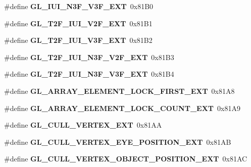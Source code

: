 \begin{DoxyCompactItemize}
\item 
\#define {\bfseries G\+L\+\_\+\+I\+U\+I\+\_\+\+N3\+F\+\_\+\+V3\+F\+\_\+\+E\+X\+T}~0x81\+B0\label{_s_d_l__opengl_8h_a821236f54a3d536e39d0c0c1b2c2200b}

\item 
\#define {\bfseries G\+L\+\_\+\+T2\+F\+\_\+\+I\+U\+I\+\_\+\+V2\+F\+\_\+\+E\+X\+T}~0x81\+B1\label{_s_d_l__opengl_8h_a28149ed35e8f7d352392774603609517}

\item 
\#define {\bfseries G\+L\+\_\+\+T2\+F\+\_\+\+I\+U\+I\+\_\+\+V3\+F\+\_\+\+E\+X\+T}~0x81\+B2\label{_s_d_l__opengl_8h_ae051338aef670c8b34639269e174cbe6}

\item 
\#define {\bfseries G\+L\+\_\+\+T2\+F\+\_\+\+I\+U\+I\+\_\+\+N3\+F\+\_\+\+V2\+F\+\_\+\+E\+X\+T}~0x81\+B3\label{_s_d_l__opengl_8h_a950fe08f37bcf9082bf5ec6d1479668c}

\item 
\#define {\bfseries G\+L\+\_\+\+T2\+F\+\_\+\+I\+U\+I\+\_\+\+N3\+F\+\_\+\+V3\+F\+\_\+\+E\+X\+T}~0x81\+B4\label{_s_d_l__opengl_8h_a3b24af74462b4d1a8dc2f14f5fc36df5}

\item 
\#define {\bfseries G\+L\+\_\+\+A\+R\+R\+A\+Y\+\_\+\+E\+L\+E\+M\+E\+N\+T\+\_\+\+L\+O\+C\+K\+\_\+\+F\+I\+R\+S\+T\+\_\+\+E\+X\+T}~0x81\+A8\label{_s_d_l__opengl_8h_a48ceffdaa56a2f7055a7abb661325528}

\item 
\#define {\bfseries G\+L\+\_\+\+A\+R\+R\+A\+Y\+\_\+\+E\+L\+E\+M\+E\+N\+T\+\_\+\+L\+O\+C\+K\+\_\+\+C\+O\+U\+N\+T\+\_\+\+E\+X\+T}~0x81\+A9\label{_s_d_l__opengl_8h_a255a5ce7f18b7f1b28746355714bfe84}

\item 
\#define {\bfseries G\+L\+\_\+\+C\+U\+L\+L\+\_\+\+V\+E\+R\+T\+E\+X\+\_\+\+E\+X\+T}~0x81\+A\+A\label{_s_d_l__opengl_8h_a8fa1f1abe100d42d2308aecfda8933f1}

\item 
\#define {\bfseries G\+L\+\_\+\+C\+U\+L\+L\+\_\+\+V\+E\+R\+T\+E\+X\+\_\+\+E\+Y\+E\+\_\+\+P\+O\+S\+I\+T\+I\+O\+N\+\_\+\+E\+X\+T}~0x81\+A\+B\label{_s_d_l__opengl_8h_add3da2e87a704008bb147fd6535f57f3}

\item 
\#define {\bfseries G\+L\+\_\+\+C\+U\+L\+L\+\_\+\+V\+E\+R\+T\+E\+X\+\_\+\+O\+B\+J\+E\+C\+T\+\_\+\+P\+O\+S\+I\+T\+I\+O\+N\+\_\+\+E\+X\+T}~0x81\+A\+C\label{_s_d_l__opengl_8h_af88e54b01a0fce068fff831cb60fa91d}


\end{DoxyCompactItemize}
